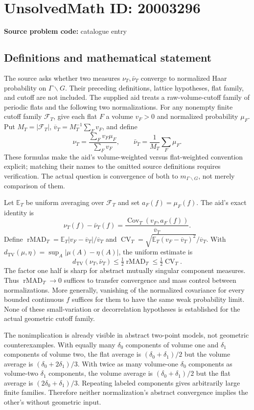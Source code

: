 \documentclass[11pt]{article}
\newcommand{\E}{\mathbb{E}}
\begin{document}
\section*{UnsolvedMath ID: 20003296}
\textbf{Source problem code:} catalogue entry
\subsection{Definitions and mathematical statement}
The source asks whether two measures $\nu_T,\bar\nu_T$ converge to normalized Haar probability on $\Gamma\backslash G$. Their preceding definitions, lattice hypotheses, flat family, and cutoff are not included. The supplied aid treats a raw-volume-cutoff family of periodic flats and the following two normalizations. For any nonempty finite cutoff family $\mathcal F_T$, give each flat $F$ a volume $v_F>0$ and normalized probability $\mu_F$. Put $M_T=|\mathcal F_T|$, $\overline v_T=M_T^{-1}\sum_Fv_F$, and define
\[
\nu_T=\frac{\sum_Fv_F\mu_F}{\sum_Fv_F},\qquad
\bar\nu_T=\frac1{M_T}\sum_F\mu_F.
\]
These formulas make the aid's volume-weighted versus flat-weighted convention explicit; matching their names to the omitted source definitions requires verification. The actual question is convergence of both to $m_{\Gamma\backslash G}$, not merely comparison of them.

Let $\E_T$ be uniform averaging over $\mathcal F_T$ and set $a_F(f)=\mu_F(f)$. The aid's exact identity is
\[
\nu_T(f)-\bar\nu_T(f)=
\frac{\operatorname{Cov}_T(v_F,a_F(f))}{\overline v_T}.
\]
Define $\operatorname{rMAD}_T=\E_T|v_F-\overline v_T|/\overline v_T$ and $\operatorname{CV}_T=\sqrt{\E_T(v_F-\overline v_T)^2}/\overline v_T$. With $d_{\mathrm{TV}}(\mu,\eta)=\sup_A|\mu(A)-\eta(A)|$, the uniform estimate is
\[
d_{\mathrm{TV}}(\nu_T,\bar\nu_T)\leq\tfrac12\operatorname{rMAD}_T
\leq\tfrac12\operatorname{CV}_T.
\]
The factor one half is sharp for abstract mutually singular component measures. Thus $\operatorname{rMAD}_T\to0$ suffices to transfer convergence and mass control between normalizations. More generally, vanishing of the normalized covariance for every bounded continuous $f$ suffices for them to have the same weak probability limit. None of these small-variation or decorrelation hypotheses is established for the actual geometric cutoff family.

The nonimplication is already visible in abstract two-point models, not geometric counterexamples. With equally many $\delta_0$ components of volume one and $\delta_1$ components of volume two, the flat average is $(\delta_0+\delta_1)/2$ but the volume average is $(\delta_0+2\delta_1)/3$. With twice as many volume-one $\delta_0$ components as volume-two $\delta_1$ components, the volume average is $(\delta_0+\delta_1)/2$ but the flat average is $(2\delta_0+\delta_1)/3$. Repeating labeled components gives arbitrarily large finite families. Therefore neither normalization's abstract convergence implies the other's without geometric input.
\end{document}
